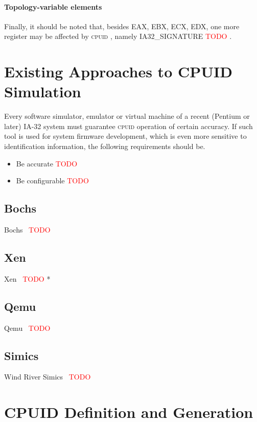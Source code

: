 \documentclass[a4paper,10pt,oneside,unicode]{article}
\newcommand{\cpuid}{\textsc{cpuid} }
\newcommand{\todo}[1][]{\textcolor{red}{TODO #1}}
\begin{document}
\paragraph{Topology-variable elements}

Finally, it should be noted that, besides EAX, EBX, ECX, EDX, one more register may be affected by \cpuid, namely IA32\_SIGNATURE \todo.

\section{Existing Approaches to CPUID Simulation}\label{sec:approaches}

Every software simulator, emulator or virtual machine of a recent (Pentium or later) IA-32 system must guarantee \cpuid operation of certain accuracy. If such tool is used for system firmware development, which is even more sensitive to identification information, the following requirements should be.

\begin{itemize}
\item Be accurate \todo
\item Be configurable \todo
\end{itemize}

\subsection{Bochs}

Bochs~\cite{bochs} \todo 

\subsection{Xen}

Xen~\cite{xen2006} \todo *

\subsection{Qemu}

Qemu~\cite{qemu} \todo 

\subsection{Simics}

Wind River Simics~\cite{simics} \todo

\section{CPUID Definition and Generation}\label{sec:cpuidgen}
\end{document}
